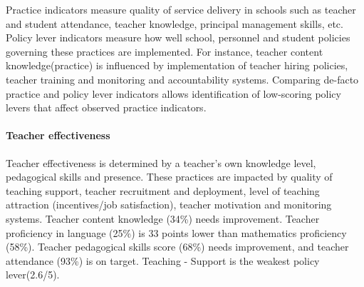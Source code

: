 \documentclass[
  twocolumn]{article}
\begin{document}
Practice indicators measure quality of service delivery in schools such
as teacher and student attendance, teacher knowledge, principal
management skills, etc. Policy lever indicators measure how well school,
personnel and student policies governing these practices are
implemented. For instance, teacher content knowledge(practice) is
influenced by implementation of teacher hiring policies, teacher
training and monitoring and accountability systems. Comparing de-facto
practice and policy lever indicators allows identification of
low-scoring policy levers that affect observed practice indicators.

\hypertarget{teacher-effectiveness}{%
\paragraph{\texorpdfstring{\textbf{Teacher
effectiveness}}{Teacher effectiveness}}\label{teacher-effectiveness}}

Teacher effectiveness is determined by a teacher's own knowledge level,
pedagogical skills and presence. These practices are impacted by quality
of teaching support, teacher recruitment and deployment, level of
teaching attraction (incentives/job satisfaction), teacher motivation
and monitoring systems. Teacher content knowledge (34\%) needs
improvement. Teacher proficiency in language (25\%) is 33 points lower
than mathematics proficiency (58\%). Teacher pedagogical skills score
(68\%) needs improvement, and teacher attendance (93\%) is on target.
Teaching - Support is the weakest policy lever(2.6/5).
\end{document}
